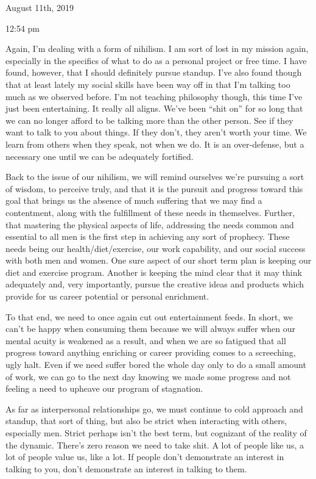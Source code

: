 \bigskip
\bigskip
August 11th, 2019

12:54 pm

Again, I'm dealing with a form of nihilism. I am sort of lost in my
mission again, especially in the specifics of what to do as a personal
project or free time. I have found, however, that I should definitely
pursue standup. I've also found though that at least lately my social
skills have been way off in that I'm talking too much as we observed
before. I'm not teaching philosophy though, this time I've just been
entertaining. It really all aligns. We've been ``shit on'' for so long
that we can no longer afford to be talking more than the other person.
See if they want to talk to you about things. If they don't, they aren't
worth your time. We learn from others when they speak, not when we do.
It is an over-defense, but a necessary one until we can be adequately
fortified.

Back to the issue of our nihilism, we will remind ourselves we're
pursuing a sort of wisdom, to perceive truly, and that it is the pursuit
and progress toward this goal that brings us the absence of much
suffering that we may find a contentment, along with the fulfillment of
these needs in themselves. Further, that mastering the physical aspects
of life, addressing the needs common and essential to all men is the
first step in achieving any sort of prophecy. These needs being our
health/diet/exercise, our work capability, and our social success with
both men and women. One sure aspect of our short term plan is keeping
our diet and exercise program. Another is keeping the mind clear that it
may think adequately and, very importantly, pursue the creative ideas
and products which provide for us career potential or personal
enrichment.

To that end, we need to once again cut out entertainment feeds. In
short, we can't be happy when consuming them because we will always
suffer when our mental acuity is weakened as a result, and when we are
so fatigued that all progress toward anything enriching or career
providing comes to a screeching, ugly halt. Even if we need suffer bored
the whole day only to do a small amount of work, we can go to the next
day knowing we made some progress and not feeling a need to upheave our
program of stagnation.

As far as interpersonal relationships go, we must continue to cold
approach and standup, that sort of thing, but also be strict when
interacting with others, especially men. Strict perhaps isn't the best
term, but cognizant of the reality of the dynamic. There's zero reason
we need to take shit. A lot of people like us, a lot of people value us,
like a lot. If people don't demonstrate an interest in talking to you,
don't demonstrate an interest in talking to them.


